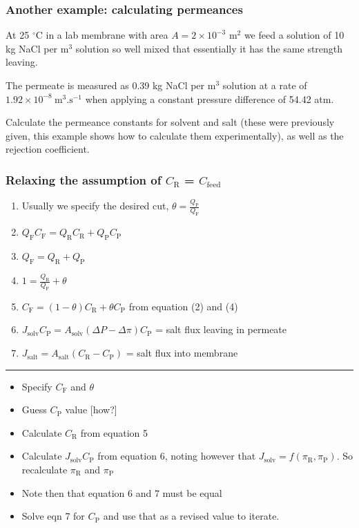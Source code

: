 \begin{frame}\frametitle{Another example: calculating permeances}
	At 25 $^\circ$C in a lab membrane with area $A = 2 \times 10^{-3}$ $\text{m}^{2}$ we feed a solution of 10 kg NaCl per m$^3$ solution so well mixed that essentially it has the same strength leaving.
	
	\vspace{12pt}
	The permeate is measured as 0.39 kg NaCl per $\text{m}^{3}$ solution at a rate of $1.92 \times 10^{-8}~\text{m}^3\text{.s}^{-1}$ when applying a constant pressure difference of 54.42 atm.
	
	\vspace{12pt}
	Calculate the permeance constants for solvent and salt (these were previously given, this example shows how to calculate them experimentally), as well as the rejection coefficient.	
\end{frame}

\begin{frame}\frametitle{Relaxing the assumption of $C_\text{R}$ = $C_\text{feed}$}
	\begin{enumerate}
		\item	Usually we specify the desired cut, $\theta = \displaystyle \frac{Q_\text{P}}{Q_\text{F}}$
		\item	$Q_\text{F} C_\text{F} = Q_\text{R} C_\text{R} + Q_\text{P} C_\text{P}$
		\item	$Q_\text{F} = Q_\text{R} + Q_\text{P}$
		\item	$1 = \displaystyle \frac{Q_\text{R}}{Q_\text{F}} + \theta$
		\item	$C_\text{F} = (1 - \theta)C_\text{R} + \theta C_\text{P}$ from equation (2) and (4)
		\item	$J_\text{solv}C_\text{P} = A_\text{solv}(\Delta P - \Delta \pi)C_\text{P}$ = salt flux leaving in permeate
		\item	$J_\text{salt} = A_\text{salt}(C_\text{R} - C_\text{P})$ = salt flux into membrane
	\end{enumerate}
	\hrule
	\begin{itemize}
		\item	Specify $C_\text{F}$ and $\theta$
		\item	Guess $C_\text{P}$ value [how?]
		\item	Calculate $C_\text{R}$ from equation 5
		\item	Calculate $J_\text{solv} C_\text{P}$ from equation 6, noting however that $J_\text{solv} = f(\pi_\text{R}, \pi_\text{P})$. So recalculate $\pi_\text{R}$ and $\pi_\text{P}$
		\item	Note then that equation 6 and 7 must be equal
		\item	Solve eqn 7 for $C_\text{P}$ and use that as a revised value to iterate.
	\end{itemize}
\end{frame}

